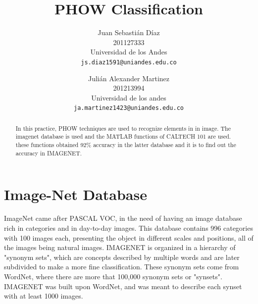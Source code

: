 \documentclass[10pt,twocolumn,letterpaper]{article}
\begin{document}
\title{PHOW Classification}

\author{Juan Sebasti\'an D\'iaz\\
201127333\\
Universidad de los Andes\\
{\tt\small js.diaz1591@uniandes.edu.co}
\and
Juli\'an Alexander Martinez\\
201213994\\
Universidad de los andes\\
{\tt\small ja.martinez1423@uniandes.edu.co}
}

\maketitle

\begin{abstract}
   In this practice, PHOW techniques are used to recognize elements in in image. The imagenet database is used and the MATLAB  functions of CALTECH 101  are used. these functions obtained 92\% accuracy in the latter database and it is to find out the accuracy in IMAGENET.
\end{abstract}

\section{Image-Net Database}

ImageNet came after PASCAL VOC, in the need of having an image database rich in categories and in day-to-day images. This database contains 996 categories with 100 images each, presenting the object in different scales and positions, all of the images being natural images. IMAGENET is organized in a hierarchy of "synonym sets", which are concepts described by multiple words and are later subdivided to make a more fine classification. These synonym sets come from WordNet, where there are more that 100,000 synonym sets or "synsets". IMAGENET was built upon WordNet, and was meant to describe each synset with at least 1000 images.
\end{document}
